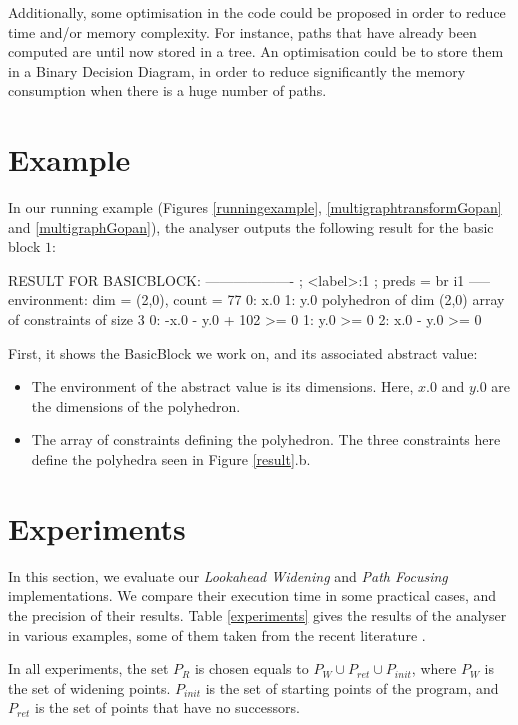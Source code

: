 \documentclass[a4paper,english,titlepage,11pt]{report}
\begin{document}
Additionally, some optimisation in the code could be proposed in order to
reduce time and/or memory complexity. For instance, paths that have already been
computed are until now stored in a tree. An optimisation could be to store them
in a Binary Decision Diagram, in order to reduce significantly the memory
consumption when there is a huge number of paths.

	\section{Example}

	In our running example (Figures \ref{runningexample},
	\ref{multigraphtransformGopan} and \ref{multigraphGopan}), the analyser
	outputs the following result for the basic block $1$:

\begin{C}
RESULT FOR BASICBLOCK: -------------------
; <label>:1                                 ; preds = %
  br i1 %
-----
environment: dim = (2,0), count = 77
 0: x.0
 1: y.0
polyhedron of dim (2,0)
array of constraints of size 3
 0: -x.0 - y.0 + 102 >= 0
 1: y.0 >= 0
 2: x.0 - y.0 >= 0
\end{C}

First, it shows the BasicBlock we work on, and its associated abstract value:
\begin{itemize}
\item The environment of the abstract value is its dimensions. Here, $x.0$ and
$y.0$ are the dimensions of the polyhedron.
\item The array of constraints defining the polyhedron. The three constraints
here define the polyhedra seen in Figure \ref{result}.b.
\end{itemize}

 \section{Experiments}

	In this section, we evaluate our \emph{Lookahead Widening} and \emph{Path
	Focusing} implementations. We compare their execution time in some
	practical cases, and the precision of their results. Table \ref{experiments}
	gives the results of the analyser in various examples, some of them taken
	from the recent literature \cite{CGGMP05,GopanR06}.

	In all experiments, the set $P_R$ is chosen equals to $P_W \cup P_{ret} \cup
	P_{init}$,
	where $P_W$ is the set of widening points. $P_{init}$ is the set of starting
	points of the program, and $P_{ret}$ is the set of points that have no
	successors.
\end{document}
